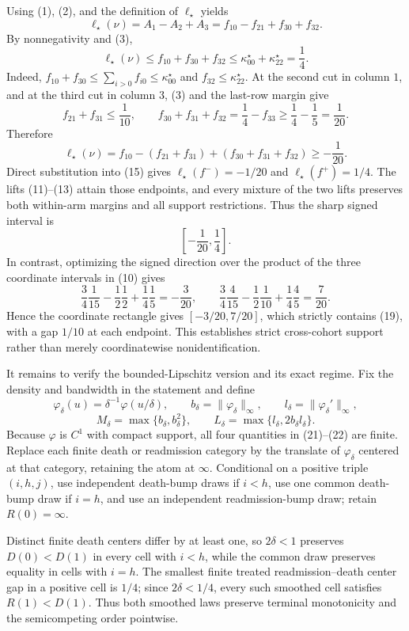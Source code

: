 Using (1), (2), and the definition of \(\ell_\star\) yields
\[
 \ell_\star(\nu)=A_1-A_2+A_3
 =f_{10}-f_{21}+f_{30}+f_{32}. \tag{15}
\]
By nonnegativity and (3),
\[
 \ell_\star(\nu)
 \leq f_{10}+f_{30}+f_{32}
 \leq\kappa^\star_{00}+\kappa^\star_{22}
 =\frac14. \tag{16}
\]
Indeed, \(f_{10}+f_{30}\leq\sum_{i>0}f_{i0}\leq\kappa^\star_{00}\) and \(f_{32}\leq\kappa^\star_{22}\).  At the second cut in column \(1\), and at the third cut in column \(3\), (3) and the last-row margin give
\[
 f_{21}+f_{31}\leq\frac1{10},\qquad
 f_{30}+f_{31}+f_{32}
 =\frac14-f_{33}\geq\frac14-\frac15=\frac1{20}. \tag{17}
\]
Therefore
\[
 \ell_\star(\nu)
 =f_{10}-(f_{21}+f_{31})+(f_{30}+f_{31}+f_{32})
 \geq-\frac1{20}. \tag{18}
\]
Direct substitution into (15) gives \(\ell_\star(f^-)=-1/20\) and \(\ell_\star(f^+)=1/4\).  The lifts (11)--(13) attain those endpoints, and every mixture of the two lifts preserves both within-arm margins and all support restrictions.  Thus the sharp signed interval is
\[
 \left[-\frac1{20},\frac14\right]. \tag{19}
\]
In contrast, optimizing the signed direction over the product of the three coordinate intervals in (10) gives
\[
 \frac34\frac1{15}-\frac12\frac12+\frac14\frac15=-\frac3{20},
 \qquad
 \frac34\frac4{15}-\frac12\frac1{10}+\frac14\frac45=\frac7{20}. \tag{20}
\]
Hence the coordinate rectangle gives \([-3/20,7/20]\), which strictly contains (19), with a gap \(1/10\) at each endpoint.  This establishes strict cross-cohort support rather than merely coordinatewise nonidentification.

It remains to verify the bounded-Lipschitz version and its exact regime.  Fix the density and bandwidth in the statement and define
\[
 \varphi_\delta(u)=\delta^{-1}\varphi(u/\delta),\qquad
 b_\delta=\|\varphi_\delta\|_\infty,\qquad
 l_\delta=\|\varphi_\delta'\|_\infty,
\tag{21}
\]
\[
 M_\delta=\max\{b_\delta,b_\delta^2\},\qquad
 L_\delta=\max\{l_\delta,2b_\delta l_\delta\}. \tag{22}
\]
Because \(\varphi\) is \(C^1\) with compact support, all four quantities in (21)--(22) are finite.  Replace each finite death or readmission category by the translate of \(\varphi_\delta\) centered at that category, retaining the atom at \(\infty\).  Conditional on a positive triple \((i,h,j)\), use independent death-bump draws if \(i<h\), use one common death-bump draw if \(i=h\), and use an independent readmission-bump draw; retain \(R(0)=\infty\).

Distinct finite death centers differ by at least one, so \(2\delta<1\) preserves \(D(0)<D(1)\) in every cell with \(i<h\), while the common draw preserves equality in cells with \(i=h\).  The smallest finite treated readmission--death center gap in a positive cell is \(1/4\); since \(2\delta<1/4\), every such smoothed cell satisfies \(R(1)<D(1)\).  Thus both smoothed laws preserve terminal monotonicity and the semicompeting order pointwise.

